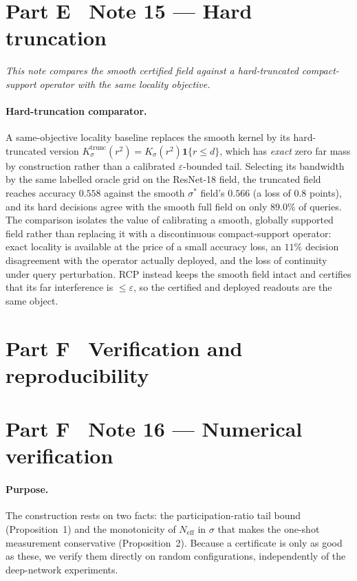 \documentclass[10pt,twocolumn]{article}
\newcommand{\sstar}{\sigma^{*}}
\newcommand{\Neff}{N_{\mathrm{eff}}}
\begin{document}
\section*{Part E \textperiodcentered\ Note 15 --- Hard truncation}
\emph{This note compares the smooth certified field against a hard-truncated compact-support operator with the same locality objective.}
\paragraph{Hard-truncation comparator.} A same-objective locality baseline replaces the smooth kernel by its hard-truncated version $K^{\mathrm{trunc}}_\sigma(r^2)=K_\sigma(r^2)\mathbf{1}\{r\le d\}$, which has \emph{exact} zero far mass by construction rather than a calibrated $\varepsilon$-bounded tail. Selecting its bandwidth by the same labelled oracle grid on the ResNet-18 field, the truncated field reaches accuracy $0.558$ against the smooth $\sstar$ field's $0.566$ (a loss of $0.8$ points), and its hard decisions agree with the smooth full field on only $89.0\%$ of queries. The comparison isolates the value of calibrating a smooth, globally supported field rather than replacing it with a discontinuous compact-support operator: exact locality is available at the price of a small accuracy loss, an $11\%$ decision disagreement with the operator actually deployed, and the loss of continuity under query perturbation. RCP instead keeps the smooth field intact and certifies that its far interference is $\le\varepsilon$, so the certified and deployed readouts are the same object.


\FloatBarrier
\section*{Part F \textperiodcentered\ Verification and reproducibility}

\section*{Part F \textperiodcentered\ Note 16 --- Numerical verification}
\paragraph{Purpose.} The construction rests on two facts: the participation-ratio tail bound (Proposition~1) and the monotonicity of $\Neff$ in $\sigma$ that makes the one-shot measurement conservative (Proposition~2). Because a certificate is only as good as these, we verify them directly on random configurations, independently of the deep-network experiments.
\end{document}
